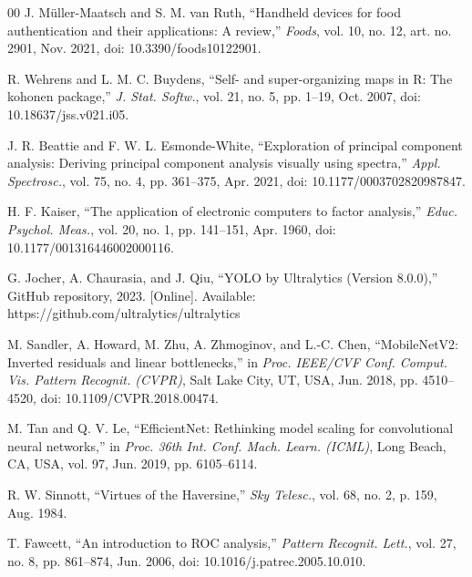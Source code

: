 \documentclass[conference]{IEEEtran}
\begin{document}
\begin{thebibliography}{00}
J. M{\"u}ller-Maatsch and S. M. van Ruth, ``Handheld devices for food authentication and their applications: A review,'' \textit{Foods}, vol. 10, no. 12, art. no. 2901, Nov. 2021, doi: 10.3390/foods10122901.

R. Wehrens and L. M. C. Buydens, ``Self- and super-organizing maps in R: The kohonen package,'' \textit{J. Stat. Softw.}, vol. 21, no. 5, pp. 1--19, Oct. 2007, doi: 10.18637/jss.v021.i05.

J. R. Beattie and F. W. L. Esmonde-White, ``Exploration of principal component analysis: Deriving principal component analysis visually using spectra,'' \textit{Appl. Spectrosc.}, vol. 75, no. 4, pp. 361--375, Apr. 2021, doi: 10.1177/0003702820987847.

H. F. Kaiser, ``The application of electronic computers to factor analysis,'' \textit{Educ. Psychol. Meas.}, vol. 20, no. 1, pp. 141--151, Apr. 1960, doi: 10.1177/001316446002000116.

G. Jocher, A. Chaurasia, and J. Qiu, ``YOLO by Ultralytics (Version 8.0.0),'' GitHub repository, 2023. [Online]. Available: https://github.com/ultralytics/ultralytics

M. Sandler, A. Howard, M. Zhu, A. Zhmoginov, and L.-C. Chen, ``MobileNetV2: Inverted residuals and linear bottlenecks,'' in \textit{Proc. IEEE/CVF Conf. Comput. Vis. Pattern Recognit. (CVPR)}, Salt Lake City, UT, USA, Jun. 2018, pp. 4510--4520, doi: 10.1109/CVPR.2018.00474.

M. Tan and Q. V. Le, ``EfficientNet: Rethinking model scaling for convolutional neural networks,'' in \textit{Proc. 36th Int. Conf. Mach. Learn. (ICML)}, Long Beach, CA, USA, vol. 97, Jun. 2019, pp. 6105--6114.

R. W. Sinnott, ``Virtues of the Haversine,'' \textit{Sky Telesc.}, vol. 68, no. 2, p. 159, Aug. 1984.

T. Fawcett, ``An introduction to ROC analysis,'' \textit{Pattern Recognit. Lett.}, vol. 27, no. 8, pp. 861--874, Jun. 2006, doi: 10.1016/j.patrec.2005.10.010.
\end{thebibliography}
\end{document}
